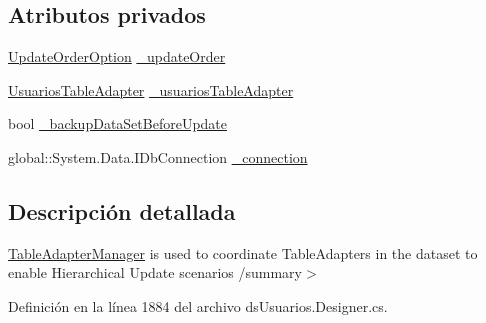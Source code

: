 \subsection*{Atributos privados}
\begin{DoxyCompactItemize}
\item 
\hyperlink{class_proyecto___integrador__3_1_1ds_usuarios_table_adapters_1_1_table_adapter_manager_a3e5008a49cc02b346d809e432b3a9412}{Update\-Order\-Option} \hyperlink{class_proyecto___integrador__3_1_1ds_usuarios_table_adapters_1_1_table_adapter_manager_a351fe80e0559850b01f9bfee27347544}{\-\_\-update\-Order}
\item 
\hyperlink{class_proyecto___integrador__3_1_1ds_usuarios_table_adapters_1_1_usuarios_table_adapter}{Usuarios\-Table\-Adapter} \hyperlink{class_proyecto___integrador__3_1_1ds_usuarios_table_adapters_1_1_table_adapter_manager_abe0673c88efe0b34254112af02c6501c}{\-\_\-usuarios\-Table\-Adapter}
\item 
bool \hyperlink{class_proyecto___integrador__3_1_1ds_usuarios_table_adapters_1_1_table_adapter_manager_acdc4a818c09d102e2280c4304521a3d5}{\-\_\-backup\-Data\-Set\-Before\-Update}
\item 
global\-::\-System.\-Data.\-I\-Db\-Connection \hyperlink{class_proyecto___integrador__3_1_1ds_usuarios_table_adapters_1_1_table_adapter_manager_aef9cd5836c8b96c7a2b8f74de99264b5}{\-\_\-connection}
\end{DoxyCompactItemize}


\subsection{Descripción detallada}
\hyperlink{class_proyecto___integrador__3_1_1ds_usuarios_table_adapters_1_1_table_adapter_manager}{Table\-Adapter\-Manager} is used to coordinate Table\-Adapters in the dataset to enable Hierarchical Update scenarios /summary$>$ 

Definición en la línea 1884 del archivo ds\-Usuarios.\-Designer.\-cs.



